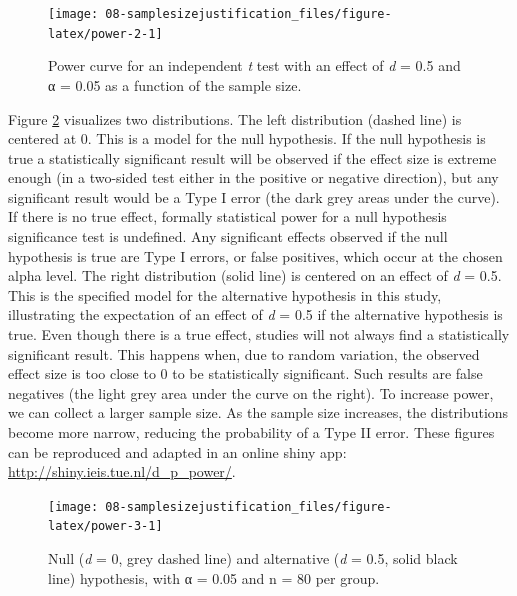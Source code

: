 \documentclass[
  oneside]{krantz}
\begin{document}
\begin{figure}

{\centering \texttt{[image: 08-samplesizejustification\_files/figure-latex/power-2-1]} 

}

\caption{Power curve for an independent \emph{t} test with an effect of \emph{d} = 0.5 and α = 0.05 as a function of the sample size.}\label{fig:power-2}
\end{figure}

Figure \ref{fig:power-3} visualizes two distributions. The left distribution (dashed line) is centered at 0. This is a model for the null hypothesis. If the null hypothesis is true a statistically significant result will be observed if the effect size is extreme enough (in a two-sided test either in the positive or negative direction), but any significant result would be a Type I error (the dark grey areas under the curve). If there is no true effect, formally statistical power for a null hypothesis significance test is undefined. Any significant effects observed if the null hypothesis is true are Type I errors, or false positives, which occur at the chosen alpha level. The right distribution (solid line) is centered on an effect of \emph{d} = 0.5. This is the specified model for the alternative hypothesis in this study, illustrating the expectation of an effect of \emph{d} = 0.5 if the alternative hypothesis is true. Even though there is a true effect, studies will not always find a statistically significant result. This happens when, due to random variation, the observed effect size is too close to 0 to be statistically significant. Such results are false negatives (the light grey area under the curve on the right). To increase power, we can collect a larger sample size. As the sample size increases, the distributions become more narrow, reducing the probability of a Type II error. These figures can be reproduced and adapted in an online shiny app: \url{http://shiny.ieis.tue.nl/d_p_power/}.



\begin{figure}

{\centering \texttt{[image: 08-samplesizejustification\_files/figure-latex/power-3-1]} 

}

\caption{Null (\emph{d} = 0, grey dashed line) and alternative (\emph{d} = 0.5, solid black line) hypothesis, with α = 0.05 and n = 80 per group.}\label{fig:power-3}
\end{figure}
\end{document}

